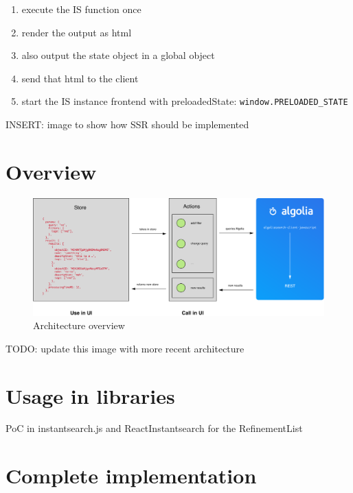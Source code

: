 \begin{enumerate}
  \item execute the IS function once
  \item render the output as html
  \item also output the state object in a global object
  \item send that html to the client
  \item start the IS instance frontend with preloadedState: {\tt window.PRELOADED\_STATE} %
\end{enumerate}

INSERT: image to show how SSR should be implemented %


\section{Overview} %
\label{sec:overview}

\begin{figure}[H]
  \centering
  \includegraphics[width=\textwidth]{../assets/architecture.pdf}
  \caption{Architecture overview\cite{blog-architecture}}
  \label{figure:core-architecture}
\end{figure}

TODO: update this image with more recent architecture %


\section{Usage in libraries} %
\label{sec:usage_in_libraries}

PoC in instantsearch.js and ReactInstantsearch for the RefinementList %


\section{Complete implementation} %
\label{sec:complete_implementation}




